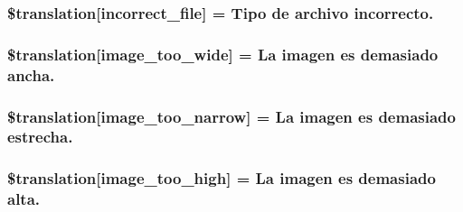 \subsubsection[{\$translation}]{\setlength{\rightskip}{0pt plus 5cm}\$translation\mbox{[}\textquotesingle{}incorrect\+\_\+file\textquotesingle{}\mbox{]} = \textquotesingle{}Tipo de archivo incorrecto.\textquotesingle{}}\label{class_8upload_8es___e_s_8php_a4d32343e2699edd6fd435f9c832cb9c7}
\hypertarget{class_8upload_8es___e_s_8php_a0dd3e4930ca1f59ae280f4b1006525cd}{}
\subsubsection[{\$translation}]{\setlength{\rightskip}{0pt plus 5cm}\$translation\mbox{[}\textquotesingle{}image\+\_\+too\+\_\+wide\textquotesingle{}\mbox{]} = \textquotesingle{}La imagen es demasiado ancha.\textquotesingle{}}\label{class_8upload_8es___e_s_8php_a0dd3e4930ca1f59ae280f4b1006525cd}
\hypertarget{class_8upload_8es___e_s_8php_a5c9a4cd67fd21c32e0a3b434591a6037}{}
\subsubsection[{\$translation}]{\setlength{\rightskip}{0pt plus 5cm}\$translation\mbox{[}\textquotesingle{}image\+\_\+too\+\_\+narrow\textquotesingle{}\mbox{]} = \textquotesingle{}La imagen es demasiado estrecha.\textquotesingle{}}\label{class_8upload_8es___e_s_8php_a5c9a4cd67fd21c32e0a3b434591a6037}
\hypertarget{class_8upload_8es___e_s_8php_aa27bde361343f3b63c7cd441860024f8}{}
\subsubsection[{\$translation}]{\setlength{\rightskip}{0pt plus 5cm}\$translation\mbox{[}\textquotesingle{}image\+\_\+too\+\_\+high\textquotesingle{}\mbox{]} = \textquotesingle{}La imagen es demasiado alta.\textquotesingle{}}\label{class_8upload_8es___e_s_8php_aa27bde361343f3b63c7cd441860024f8}
\hypertarget{class_8upload_8es___e_s_8php_a86fcd4e1157b00032df451188d735527}{}
